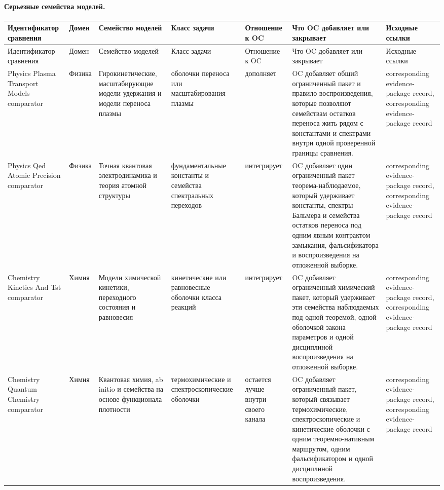 \paragraph{Серьезные семейства моделей.}
\begingroup
\scriptsize
\setlength{\emergencystretch}{1.5em}
\setlength{\tabcolsep}{2pt}
\setlength{\LTleft}{0pt}
\setlength{\LTright}{0pt}
\begin{longtable}{@{}L{0.14\textwidth}L{0.09\textwidth}L{0.14\textwidth}L{0.12\textwidth}L{0.10\textwidth}L{0.18\textwidth}L{0.15\textwidth}@{}}
\toprule
Идентификатор сравнения & Домен & Семейство моделей & Класс задачи & Отношение к OC & Что OC добавляет или закрывает & Исходные ссылки \\
\midrule
\endfirsthead
\toprule
Идентификатор сравнения & Домен & Семейство моделей & Класс задачи & Отношение к OC & Что OC добавляет или закрывает & Исходные ссылки \\
\midrule
\endhead
Physics Plasma Transport Models comparator & Физика & Гирокинетические, масштабирующие модели удержания и модели переноса плазмы & оболочки переноса или масштабирования плазмы & дополняет & OC добавляет общий ограниченный пакет и правило воспроизведения, которые позволяют семействам остатков переноса жить рядом с константами и спектрами внутри одной проверенной границы сравнения. & corresponding evidence-package record, corresponding evidence-package record \\
Physics Qed Atomic Precision comparator & Физика & Точная квантовая электродинамика и теория атомной структуры & фундаментальные константы и семейства спектральных переходов & интегрирует & OC добавляет один ограниченный пакет теорема-наблюдаемое, который удерживает константы, спектры Бальмера и семейства остатков переноса под одним явным контрактом замыкания, фальсификатора и воспроизведения на отложенной выборке. & corresponding evidence-package record, corresponding evidence-package record \\
Chemistry Kinetics And Tst comparator & Химия & Модели химической кинетики, переходного состояния и равновесия & кинетические или равновесные оболочки класса реакций & интегрирует & OC добавляет ограниченный химический пакет, который удерживает эти семейства наблюдаемых под одной теоремой, одной оболочкой закона параметров и одной дисциплиной воспроизведения на отложенной выборке. & corresponding evidence-package record, corresponding evidence-package record \\
Chemistry Quantum Chemistry comparator & Химия & Квантовая химия, ab initio и семейства на основе функционала плотности & термохимические и спектроскопические оболочки & остается лучше внутри своего канала & OC добавляет ограниченный пакет, который связывает термохимические, спектроскопические и кинетические оболочки с одним теоремно-нативным маршрутом, одним фальсификатором и одной дисциплиной воспроизведения. & corresponding evidence-package record, corresponding evidence-package record \\

\end{longtable}
